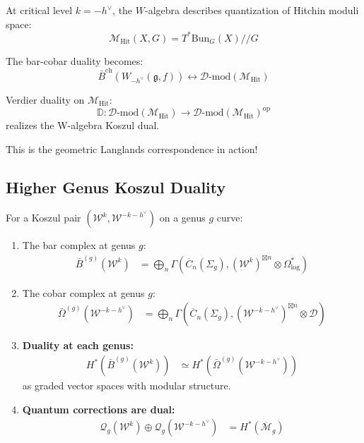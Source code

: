 \begin{remark}
At critical level $k = -h^\vee$, the $W$-algebra describes quantization of Hitchin moduli space:
$$\mathcal{M}_{\text{Hit}}(X, G) = T^*\text{Bun}_G(X) // G$$

The bar-cobar duality becomes:
$$\bar{B}^{\text{ch}}(W_{-h^\vee}(\mathfrak{g}, f)) \leftrightarrow \mathcal{D}\text{-mod}(\mathcal{M}_{\text{Hit}})$$

Verdier duality on $\mathcal{M}_{\text{Hit}}$:
$$\mathbb{D}: \mathcal{D}\text{-mod}(\mathcal{M}_{\text{Hit}}) \to \mathcal{D}\text{-mod}(\mathcal{M}_{\text{Hit}})^{\text{op}}$$
realizes the W-algebra Koszul dual.

This is the geometric Langlands correspondence in action!
\end{remark}

\subsection{Higher Genus Koszul Duality}

\begin{theorem}
For a Koszul pair $(\mathcal{W}^k, \mathcal{W}^{-k-h^\vee})$ on a genus $g$ curve:
\begin{enumerate}
\item The bar complex at genus $g$:
\begin{align}
\bar{B}^{(g)}(\mathcal{W}^k) &= \bigoplus_n \Gamma(\overline{C}_n(\Sigma_g), (\mathcal{W}^k)^{\boxtimes n} \otimes \Omega^*_{\log})
\end{align}

\item The cobar complex at genus $g$:
\begin{align}
\bar{\Omega}^{(g)}(\mathcal{W}^{-k-h^\vee}) &= \bigoplus_n \Gamma(\overline{C}_n(\Sigma_g), (\mathcal{W}^{-k-h^\vee})^{\boxtimes n} \otimes \mathcal{D})
\end{align}

\item \textbf{Duality at each genus:}
\begin{align}
H^*(\bar{B}^{(g)}(\mathcal{W}^k)) &\simeq H^*(\bar{\Omega}^{(g)}(\mathcal{W}^{-k-h^\vee}))
\end{align}
as graded vector spaces with modular structure.

\item \textbf{Quantum corrections are dual:}
\begin{align}
\mathcal{Q}_g(\mathcal{W}^k) \oplus \mathcal{Q}_g(\mathcal{W}^{-k-h^\vee}) &= H^*(\overline{\mathcal{M}}_g)
\end{align}
\end{enumerate}
\end{theorem}

